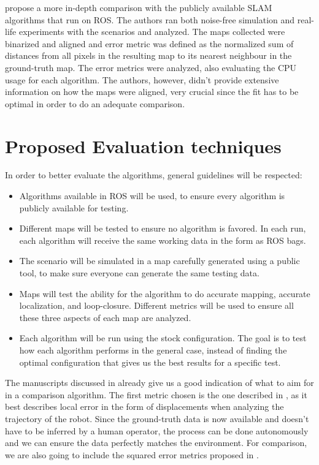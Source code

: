  \citeauthor{santos2013evaluation} propose a more in-depth comparison with the publicly available SLAM algorithms that run on ROS. The authors ran both noise-free simulation and real-life experiments with the scenarios and analyzed. The maps collected were binarized and aligned and error metric was defined as the normalized sum of distances from all pixels in the resulting map to its nearest neighbour in the ground-truth map. The error metrics were analyzed, also evaluating the CPU usage for each algorithm. The authors, however, didn't provide extensive information on how the maps were aligned, very crucial since the fit has to be optimal in order to do an adequate comparison.
 
 \section{Proposed Evaluation techniques} \label{sec:proposed-evaluation}
 
 In order to better evaluate the algorithms, general guidelines will be respected:
 
 \begin{itemize}
     \item Algorithms available in ROS will be used, to ensure every algorithm is publicly available for testing.
     \item Different maps will be tested to ensure no algorithm is favored. In each run, each algorithm will receive the same working data in the form as ROS bags.
     \item The scenario will be simulated in a map carefully generated using a public tool, to make sure everyone can generate the same testing data.
     \item Maps will test the ability for the algorithm to do accurate mapping, accurate localization, and loop-closure. Different metrics will be used to ensure all these three aspects of each map are analyzed.
     \item Each algorithm will be run using the stock configuration. The goal is to test how each algorithm performs in the general case, instead of finding the optimal configuration that gives us the best results for a specific test.
 \end{itemize}
 
The manuscripts discussed in  already give us a good indication of what to aim for in a comparison algorithm. The first metric chosen is the one described in \cite{kummerle2009measuring}, as it best describes local error in the form of displacements when analyzing the trajectory of the robot. Since the ground-truth data is now available and doesn't have to be inferred by a human operator, the process can be done autonomously and we can ensure the data perfectly matches the environment. For comparison, we are also going to include the squared error metrics proposed in .

